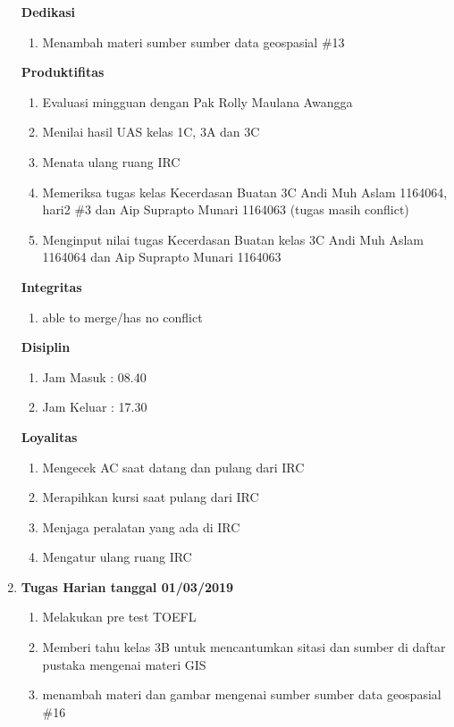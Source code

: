 \begin{enumerate}
\textbf{Dedikasi}
\begin{enumerate}
\item Menambah materi sumber sumber data geospasial \#13
\end{enumerate}

\textbf{Produktifitas}
\begin{enumerate}
\item Evaluasi mingguan dengan Pak Rolly Maulana Awangga
\item Menilai hasil UAS kelas 1C, 3A dan 3C
\item Menata ulang ruang IRC
\item Memeriksa tugas kelas Kecerdasan Buatan 3C Andi Muh Aslam 1164064, hari2 \#3 dan  Aip Suprapto Munari 1164063  (tugas masih conflict)
\item Menginput nilai tugas Kecerdasan Buatan kelas 3C Andi Muh Aslam 1164064 dan Aip Suprapto Munari 1164063 
\end{enumerate}

\textbf{Integritas}
\begin{enumerate}
\item able to merge/has no conflict
\end{enumerate}

\textbf{Disiplin}
\begin{enumerate}
\item Jam Masuk : 08.40
\item Jam Keluar : 17.30
\end{enumerate}

\textbf{Loyalitas}
\begin{enumerate}
\item Mengecek AC saat datang dan pulang dari IRC
\item Merapihkan kursi saat pulang dari IRC
\item Menjaga peralatan yang ada di IRC
\item Mengatur ulang ruang IRC 
\end{enumerate}

\item \textbf{Tugas Harian tanggal 01/03/2019}
\begin{enumerate} 
\item Melakukan pre test TOEFL 
\item Memberi tahu kelas 3B untuk mencantumkan sitasi dan sumber di daftar pustaka mengenai materi GIS
\item menambah materi dan gambar mengenai sumber sumber data geospasial \#16
\end{enumerate}


\end{enumerate}
